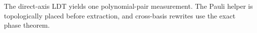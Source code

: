 
The direct-axis LDT yields one polynomial-pair measurement. The Pauli helper is
topologically placed before extraction, and cross-basis rewrites use the exact
phase theorem.


